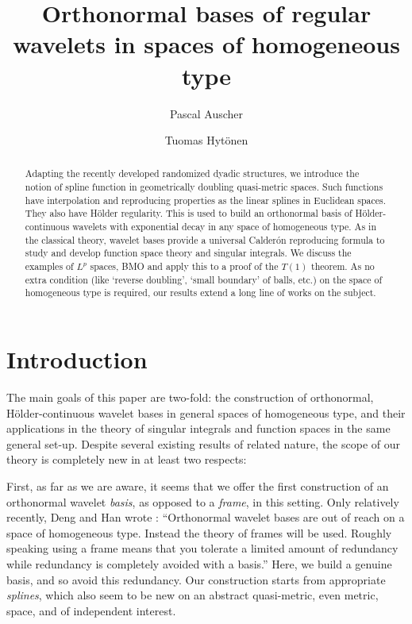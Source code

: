 \documentclass{amsart}
\title[Wavelets in spaces of homogeneous type]{Orthonormal bases of regular wavelets in spaces of homogeneous type}
\author{Pascal Auscher}
\author{Tuomas Hyt\"onen}
\numberwithin{equation}{section}
\theoremstyle{plain}
\theoremstyle{definition}
\theoremstyle{remark}
\begin{document}
\begin{abstract} Adapting the recently developed randomized dyadic structures, we introduce the notion of spline function in geometrically doubling quasi-metric spaces. 
Such functions have interpolation and reproducing properties  as the linear splines in Euclidean spaces. They also have H\"older regularity. This is used to build an orthonormal basis of H\"older-continuous wavelets with exponential decay in any space of homogeneous type. As in the classical theory, wavelet bases provide a universal  Calder\'on reproducing formula  to study and develop function space theory and singular integrals. We discuss the examples of $L^p$ spaces, BMO and apply  this to a proof of the $T(1)$ theorem. As no extra condition {(like `reverse doubling', `small boundary' of balls, etc.)} on the space of homogeneous type is required,  our results extend a long line of works on the subject.  
\end{abstract}

\maketitle

\section{Introduction}

The main goals of this paper are two-fold: the construction of orthonormal, H\"older-continuous wavelet bases in general spaces of homogeneous type, and their applications in the theory of singular integrals and function spaces in the same general set-up. Despite several existing results of related nature, the scope of our theory is completely new in at least two respects: 

First, as far as we are aware, it seems that we offer the first construction of an orthonormal wavelet \emph{basis}, as opposed to a \emph{frame}, in this setting. Only relatively recently, Deng and Han wrote \cite[p.~40]{DH}: ``Orthonormal wavelet bases are out of reach on a space of homogeneous type. Instead the theory of frames will be used. Roughly speaking using a frame means that you tolerate a limited amount of redundancy while redundancy is completely avoided with a basis.'' Here, we build a genuine basis, and so avoid this redundancy. Our construction starts from appropriate \emph{splines}, which also seem to be new on an abstract quasi-metric, even metric,  space, and of independent interest.
\end{document}
